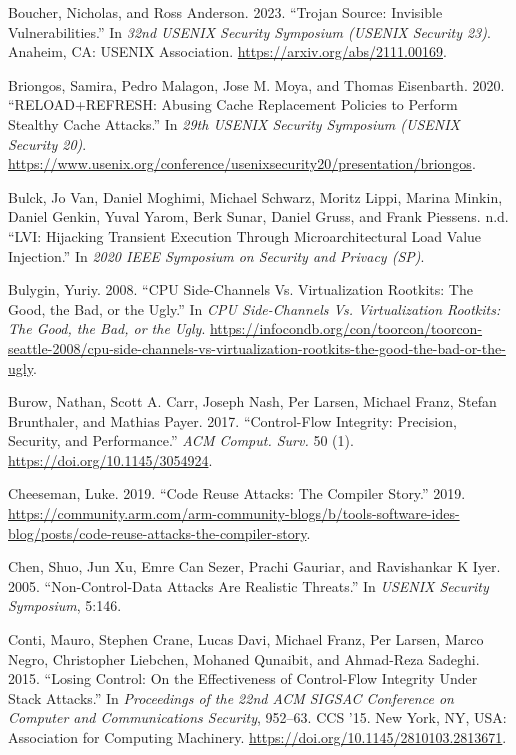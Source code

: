 \documentclass[
  a4paper,
]{report}
\newlength{\cslhangindent}
\newenvironment{CSLReferences}[2] %
{\begin{list}{}{%
	\setlength{\itemindent}{0pt}
	\setlength{\leftmargin}{0pt}
	\setlength{\parsep}{0pt}
	\ifodd #1
	\setlength{\leftmargin}{\cslhangindent}
	\setlength{\itemindent}{-1\cslhangindent}
	\fi
	\setlength{\itemsep}{#2\baselineskip}}}
{\end{list}}
\begin{document}
\begin{CSLReferences}{1}{0}
Boucher, Nicholas, and Ross Anderson. 2023. {``Trojan Source: Invisible
Vulnerabilities.''} In \emph{32nd USENIX Security Symposium (USENIX
Security 23)}. Anaheim, CA: USENIX Association.
\url{https://arxiv.org/abs/2111.00169}.

Briongos, Samira, Pedro Malagon, Jose M. Moya, and Thomas Eisenbarth.
2020. {``{RELOAD+REFRESH}: Abusing Cache Replacement Policies to Perform
Stealthy Cache Attacks.''} In \emph{29th USENIX Security Symposium
(USENIX Security 20)}.
\url{https://www.usenix.org/conference/usenixsecurity20/presentation/briongos}.

Bulck, Jo Van, Daniel Moghimi, Michael Schwarz, Moritz Lippi, Marina
Minkin, Daniel Genkin, Yuval Yarom, Berk Sunar, Daniel Gruss, and Frank
Piessens. n.d. {``{LVI}: Hijacking Transient Execution Through
Microarchitectural Load Value Injection.''} In \emph{2020 {IEEE}
Symposium on Security and Privacy ({SP})}.

Bulygin, Yuriy. 2008. {``{CPU} Side-Channels Vs. Virtualization
Rootkits: The Good, the Bad, or the Ugly.''} In \emph{CPU Side-Channels
Vs. Virtualization Rootkits: The Good, the Bad, or the Ugly}.
\url{https://infocondb.org/con/toorcon/toorcon-seattle-2008/cpu-side-channels-vs-virtualization-rootkits-the-good-the-bad-or-the-ugly}.

Burow, Nathan, Scott A. Carr, Joseph Nash, Per Larsen, Michael Franz,
Stefan Brunthaler, and Mathias Payer. 2017. {``Control-Flow Integrity:
Precision, Security, and Performance.''} \emph{ACM Comput. Surv.} 50
(1). \url{https://doi.org/10.1145/3054924}.

Cheeseman, Luke. 2019. {``Code Reuse Attacks: The Compiler Story.''}
2019.
\url{https://community.arm.com/arm-community-blogs/b/tools-software-ides-blog/posts/code-reuse-attacks-the-compiler-story}.

Chen, Shuo, Jun Xu, Emre Can Sezer, Prachi Gauriar, and Ravishankar K
Iyer. 2005. {``Non-Control-Data Attacks Are Realistic Threats.''} In
\emph{USENIX Security Symposium}, 5:146.

Conti, Mauro, Stephen Crane, Lucas Davi, Michael Franz, Per Larsen,
Marco Negro, Christopher Liebchen, Mohaned Qunaibit, and Ahmad-Reza
Sadeghi. 2015. {``Losing Control: On the Effectiveness of Control-Flow
Integrity Under Stack Attacks.''} In \emph{Proceedings of the 22nd ACM
SIGSAC Conference on Computer and Communications Security}, 952--63. CCS
'15. New York, NY, USA: Association for Computing Machinery.
\url{https://doi.org/10.1145/2810103.2813671}.


\end{CSLReferences}
\end{document}
